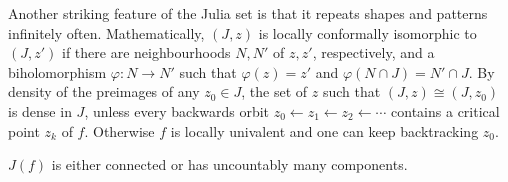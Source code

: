 \documentclass[11pt,a4paper]{article}
\begin{document}
\begin{remark}
Another striking feature of the Julia set is that it repeats shapes and patterns infinitely often. Mathematically, $(J,z)$ is locally conformally isomorphic to $(J,z')$ if there are neighbourhoods $N,N'$ of $z,z'$, respectively, and a biholomorphism $\varphi\colon N\to N'$ such that $\varphi(z)=z'$ and $\varphi(N\cap J)=N'\cap J$.
By density of the preimages of any $z_0\in J$, the set of $z$ such that $(J,z)\cong(J,z_0)$ is dense in $J$, unless every backwards orbit $z_0\leftarrow z_1\leftarrow z_2\leftarrow\cdots$ contains a critical point $z_k$ of $f$. Otherwise $f$ is locally univalent and one can keep backtracking $z_0$.
\end{remark}
\setcounter{theorem}{18}\begin{proposition}
$J(f)$ is either connected or has uncountably many components.
\end{proposition}

\end{document}
